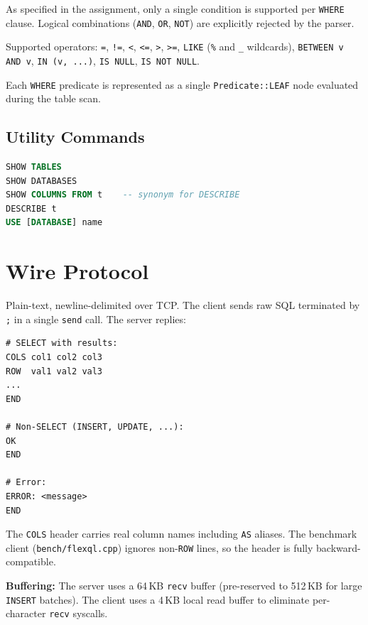 \documentclass[12pt,a4paper]{article}
\begin{document}
As specified in the assignment, only a single condition is supported per \texttt{WHERE}
clause. Logical combinations (\texttt{AND}, \texttt{OR}, \texttt{NOT}) are explicitly
rejected by the parser.

Supported operators: \texttt{=}, \texttt{!=}, \texttt{<}, \texttt{<=}, \texttt{>},
\texttt{>=}, \texttt{LIKE} (\texttt{\%} and \texttt{\_} wildcards),
\texttt{BETWEEN v AND v}, \texttt{IN (v, ...)}, \texttt{IS NULL},
\texttt{IS NOT NULL}.

Each \texttt{WHERE} predicate is represented as a single \texttt{Predicate::LEAF}
node evaluated during the table scan.

\subsection{Utility Commands}

\begin{lstlisting}[language=SQL]
SHOW TABLES
SHOW DATABASES
SHOW COLUMNS FROM t    -- synonym for DESCRIBE
DESCRIBE t
USE [DATABASE] name
\end{lstlisting}

\section{Wire Protocol}

Plain-text, newline-delimited over TCP. The client sends raw SQL terminated by
\texttt{;} in a single \texttt{send} call. The server replies:

\begin{lstlisting}[language={}]
# SELECT with results:
COLS col1 col2 col3
ROW  val1 val2 val3
...
END

# Non-SELECT (INSERT, UPDATE, ...):
OK
END

# Error:
ERROR: <message>
END
\end{lstlisting}

The \texttt{COLS} header carries real column names including \texttt{AS} aliases.
The benchmark client (\texttt{bench/flexql.cpp}) ignores non-\texttt{ROW} lines, so the
header is fully backward-compatible.

\textbf{Buffering:} The server uses a 64\,KB \texttt{recv} buffer (pre-reserved to
512\,KB for large \texttt{INSERT} batches). The client uses a 4\,KB local read buffer
to eliminate per-character \texttt{recv} syscalls.

\end{document}
